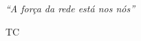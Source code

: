 \documentclass[a4paper, 11pt, oneside]{Tesi}  %
\begin{document}


\pagestyle{empty}  %



\mainmatter	  %
\pagestyle{fancy}  %




\clearpage  %

\pagestyle{empty}  %

\null\vfill
\textit{``A força da rede está nos nós''}

\begin{flushright}
TC
\end{flushright}

\vfill\vfill\vfill\vfill\vfill\vfill\null
\clearpage  %

\pagestyle{fancy}  %
\end{document}
